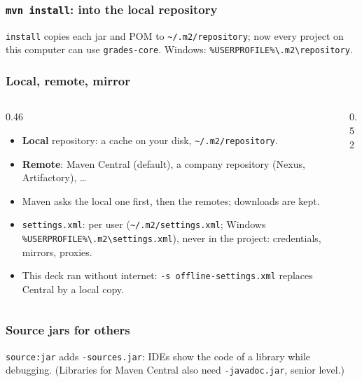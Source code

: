 \documentclass[aspectratio=169,10pt,compress]{beamer}
\begin{document}
\begin{frame}[t,fragile] \frametitle{\texttt{mvn install}: into the local repository}

  \vspace{0.1em}
  \small
  \texttt{install} copies each jar and POM to \texttt{\textasciitilde/.m2/repository}; now every project on this computer can use \texttt{grades-core}. Windows: \texttt{\%USERPROFILE\%\textbackslash .m2\textbackslash repository}.
\end{frame}




\begin{frame}[t,fragile] \frametitle{Local, remote, mirror}
  \begin{columns}[T]
    \begin{column}{0.46\textwidth}
      \begin{itemize}\small
        \item \textbf{Local} repository: a cache on your disk, \texttt{\textasciitilde/.m2/repository}.
        \item \textbf{Remote}: Maven Central (default), a company repository (Nexus, Artifactory), \dots
        \item Maven asks the local one first, then the remotes; downloads are kept.
        \item \texttt{settings.xml}: per user (\texttt{\textasciitilde/.m2/settings.xml}; Windows \texttt{\%USERPROFILE\%\textbackslash .m2\textbackslash settings.xml}), never in the project: credentials, mirrors, proxies.
        \item This deck ran without internet: \texttt{-s offline-settings.xml} replaces Central by a local copy.
      \end{itemize}
    \end{column}
    \begin{column}{0.52\textwidth}
    \end{column}
  \end{columns}
\end{frame}




\begin{frame}[t,fragile] \frametitle{Source jars for others}

  \vspace{0.1em}
  \small
  \texttt{source:jar} adds \texttt{-sources.jar}: IDEs show the code of a library while debugging. (Libraries for Maven Central also need \texttt{-javadoc.jar}, senior level.)
\end{frame}
\end{document}
